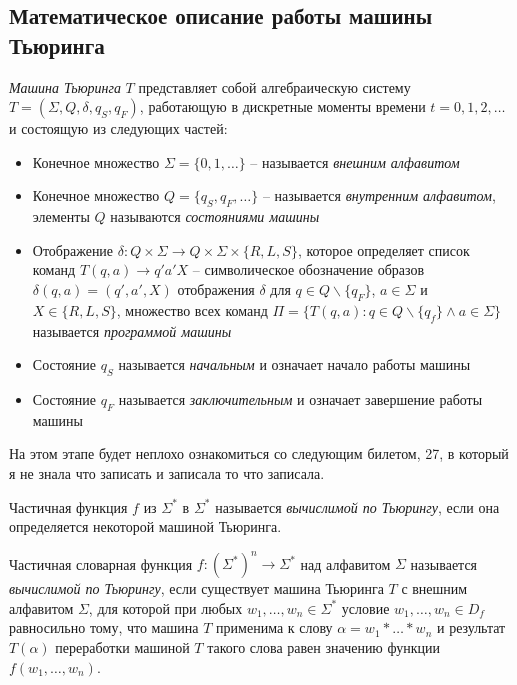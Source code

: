 \subsection*{Математическое описание работы машины Тьюринга}
\begin{definition}
    \textit{Машина Тьюринга} $T$ представляет собой алгебраическую систему $T = (\Sigma,Q,\delta, q_S,q_F)$, работающую в дискретные моменты времени $t=0,1,2,\ldots$ и состоящую из следующих частей:
    \begin{itemize}
        \item Конечное множество $\Sigma=\{0,1,\ldots\}$ -- называется \textit{внешним алфавитом}
        \item Конечное множество $Q=\{q_S,q_F,\ldots\}$ -- называется \textit{внутренним алфавитом}, элементы $Q$ называются \textit{состояниями машины}
        \item Отображение $\delta:Q\times\Sigma\rightarrow Q\times\Sigma\times\{R,L,S\}$, которое определяет список команд $T(q,a)\rightarrow q'a' X$ -- символическое обозначение образов $\delta(q,a)=(q',a',X)$ отображения $\delta$ для $q\in Q\backslash\{q_F\}$, $a\in\Sigma$ и $X\in\{R,L,S\}$, множество всех команд $\Pi = \{T(q,a):q\in Q\backslash \{q_f\}\land a\in\Sigma \}$ называется \textit{программой машины}
        \item Состояние $q_S$ называется \textit{начальным} и означает начало работы машины
        \item Состояние $q_F$ называется \textit{заключительным} и означает завершение работы машины
    \end{itemize}
\end{definition}

\begin{remark}
    На этом этапе будет неплохо ознакомиться со следующим билетом, 27, в который я не знала что записать и записала то что записала.
\end{remark}

\begin{definition}
    Частичная функция $f$ из $\Sigma^*$ в $\Sigma^*$ называется \textit{вычислимой по Тьюрингу}, если она определяется некоторой машиной Тьюринга.
\end{definition}

\begin{definition}
    Частичная словарная функция $f:(\Sigma^*)^n\rightarrow\Sigma^*$ над алфавитом $\Sigma$ называется \textit{вычислимой по Тьюрингу}, если существует машина Тьюринга $T$ с внешним алфавитом $\Sigma$, для которой при любых $w_1,\ldots,w_n\in\Sigma^*$ условие $w_1,\ldots,w_n\in D_f$ равносильно тому, что машина $T$ применима к слову $\alpha = w_1*\ldots*w_n$ и результат $T(\alpha)$ переработки машиной $T$ такого слова равен значению функции $f(w_1,\ldots,w_n)$.
\end{definition}

